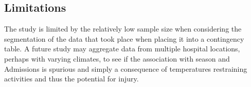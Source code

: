 \documentclass[
]{article}
\begin{document}
\subsection{Limitations}\label{limitations}

The study is limited by the relatively low sample size when considering
the segmentation of the data that took place when placing it into a
contingency table. A future study may aggregate data from multiple
hospital locations, perhaps with varying climates, to see if the
association with season and Admissions is spurious and simply a
consequence of temperatures restraining activities and thus the
potential for injury.
\end{document}
